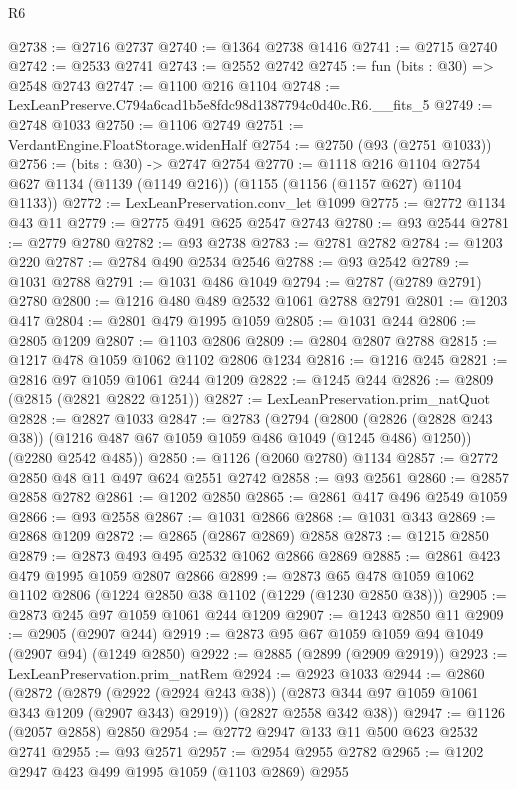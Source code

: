 \begin{lexlean}{R6}
\begin{coremodule}
@2738 := @2716 @2737
@2740 := @1364 @2738 @1416
@2741 := @2715 @2740
@2742 := @2533 @2741
@2743 := @2552 @2742
@2745 := fun (bits : @30) => @2548 @2743
@2747 := @1100 @216 @1104
@2748 := LexLeanPreserve.C794a6cad1b5e8fdc98d1387794c0d40c.R6.__fits_5
@2749 := @2748 @1033
@2750 := @1106 @2749
@2751 := VerdantEngine.FloatStorage.widenHalf
@2754 := @2750 (@93 (@2751 @1033))
@2756 := (bits : @30) -> @2747 @2754
@2770 := @1118
    @216
    @1104
    @2754
    @627
    @1134
    (@1139 (@1149 @216))
    (@1155 (@1156 (@1157 @627) @1104 @1133))
@2772 := LexLeanPreservation.conv_let @1099
@2775 := @2772 @1134 @43 @11
@2779 := @2775 @491 @625 @2547 @2743
@2780 := @93 @2544
@2781 := @2779 @2780
@2782 := @93 @2738
@2783 := @2781 @2782
@2784 := @1203 @220
@2787 := @2784 @490 @2534 @2546
@2788 := @93 @2542
@2789 := @1031 @2788
@2791 := @1031 @486 @1049
@2794 := @2787 (@2789 @2791) @2780
@2800 := @1216 @480 @489 @2532 @1061 @2788 @2791
@2801 := @1203 @417
@2804 := @2801 @479 @1995 @1059
@2805 := @1031 @244
@2806 := @2805 @1209
@2807 := @1103 @2806
@2809 := @2804 @2807 @2788
@2815 := @1217 @478 @1059 @1062 @1102 @2806 @1234
@2816 := @1216 @245
@2821 := @2816 @97 @1059 @1061 @244 @1209
@2822 := @1245 @244
@2826 := @2809 (@2815 (@2821 @2822 @1251))
@2827 := LexLeanPreservation.prim_natQuot
@2828 := @2827 @1033
@2847 := @2783
    (@2794
      (@2800 (@2826 (@2828 @243 @38)) (@1216 @487 @67 @1059 @1059 @486 @1049 (@1245 @486) @1250))
      (@2280 @2542 @485))
@2850 := @1126 (@2060 @2780) @1134
@2857 := @2772 @2850 @48 @11 @497 @624 @2551 @2742
@2858 := @93 @2561
@2860 := @2857 @2858 @2782
@2861 := @1202 @2850
@2865 := @2861 @417 @496 @2549 @1059
@2866 := @93 @2558
@2867 := @1031 @2866
@2868 := @1031 @343
@2869 := @2868 @1209
@2872 := @2865 (@2867 @2869) @2858
@2873 := @1215 @2850
@2879 := @2873 @493 @495 @2532 @1062 @2866 @2869
@2885 := @2861 @423 @479 @1995 @1059 @2807 @2866
@2899 := @2873 @65 @478 @1059 @1062 @1102 @2806 (@1224 @2850 @38 @1102 (@1229 (@1230 @2850 @38)))
@2905 := @2873 @245 @97 @1059 @1061 @244 @1209
@2907 := @1243 @2850 @11
@2909 := @2905 (@2907 @244)
@2919 := @2873 @95 @67 @1059 @1059 @94 @1049 (@2907 @94) (@1249 @2850)
@2922 := @2885 (@2899 (@2909 @2919))
@2923 := LexLeanPreservation.prim_natRem
@2924 := @2923 @1033
@2944 := @2860
    (@2872
      (@2879 (@2922 (@2924 @243 @38)) (@2873 @344 @97 @1059 @1061 @343 @1209 (@2907 @343) @2919))
      (@2827 @2558 @342 @38))
@2947 := @1126 (@2057 @2858) @2850
@2954 := @2772 @2947 @133 @11 @500 @623 @2532 @2741
@2955 := @93 @2571
@2957 := @2954 @2955 @2782
@2965 := @1202 @2947 @423 @499 @1995 @1059 (@1103 @2869) @2955

\end{coremodule}
\end{lexlean}
